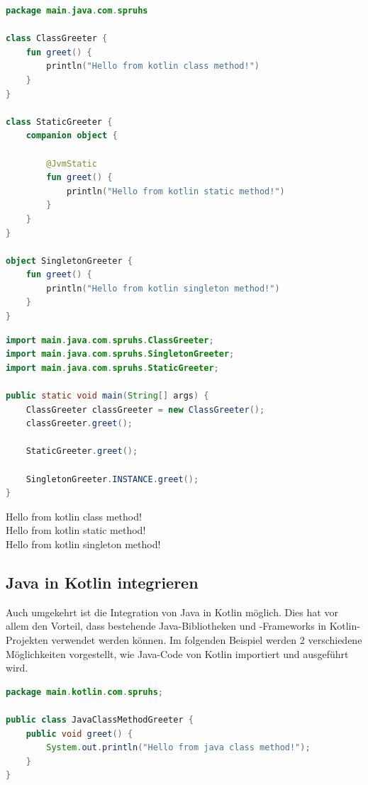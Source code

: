 \documentclass[11pt]{article}
\begin{document}
    \begin{lstlisting}[language=Kotlin, caption={KotlinGreeter.kt}]
package main.java.com.spruhs

class ClassGreeter {
    fun greet() {
        println("Hello from kotlin class method!")
    }
}

class StaticGreeter {
    companion object {

        @JvmStatic
        fun greet() {
            println("Hello from kotlin static method!")
        }
    }
}

object SingletonGreeter {
    fun greet() {
        println("Hello from kotlin singleton method!")
    }
}
    \end{lstlisting}

    \begin{lstlisting}[language=Java, caption={Main.java}]
import main.java.com.spruhs.ClassGreeter;
import main.java.com.spruhs.SingletonGreeter;
import main.java.com.spruhs.StaticGreeter;

public static void main(String[] args) {
    ClassGreeter classGreeter = new ClassGreeter();
    classGreeter.greet();

    StaticGreeter.greet();

    SingletonGreeter.INSTANCE.greet();
}
    \end{lstlisting}

    \begin{tcolorbox}[colback=black!5!white, colframe=black, title=Ausgabe]
        Hello from kotlin class method!\\
        Hello from kotlin static method!\\
        Hello from kotlin singleton method!
    \end{tcolorbox}
    
    \subsection{Java in Kotlin integrieren}
    Auch umgekehrt ist die Integration von Java in Kotlin möglich. Dies hat vor allem den Vorteil, dass bestehende Java-Bibliotheken und -Frameworks
    in Kotlin-Projekten verwendet werden können. Im folgenden Beispiel werden 2 verschiedene Möglichkeiten vorgestellt, wie Java-Code von Kotlin importiert und ausgeführt wird.

    \begin{lstlisting}[language=Java, caption={JavaClassMethodGreeter.java}]
package main.kotlin.com.spruhs;

public class JavaClassMethodGreeter {
    public void greet() {
        System.out.println("Hello from java class method!");
    }
}
    \end{lstlisting}
\end{document}

